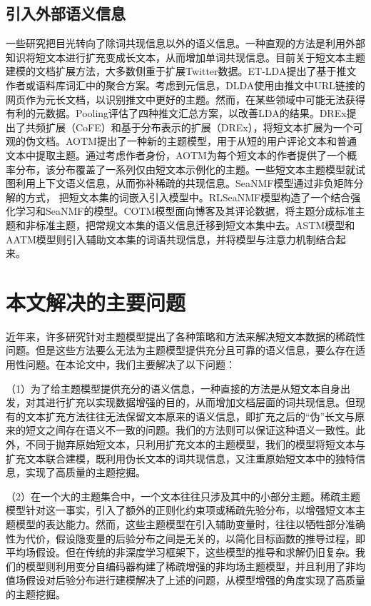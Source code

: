 \subsection{引入外部语义信息}
一些研究把目光转向了除词共现信息以外的语义信息。一种直观的方法是利用外部知识将短文本进行扩充变成长文本，从而增加单词共现信息。目前关于短文本主题建模的文档扩展方法，大多数侧重于扩展Twitter数据。ET-LDA\cite{ExTwitter}提出了基于推文作者或语料库词汇中的聚合方案。考虑到元信息，DLDA\cite{DualLDA}使用由推文中URL链接的网页作为元长文档，以识别推文中更好的主题。然而，在某些领域中可能无法获得有利的元数据。Pooling\cite{PoolTwitter}评估了四种推文汇总方案，以改善LDA的结果。DREx\cite{DREx}提出了共频扩展（CoFE）和基于分布表示的扩展（DREx），将短文本扩展为一个可观的伪文档。AOTM\cite{AOTM}提出了一种新的主题模型，用于从短的用户评论文本和普通文本中提取主题。通过考虑作者身份，AOTM为每个短文本的作者提供了一个概率分布，该分布覆盖了一系列仅由短文本示例化的主题。一些短文本主题模型就试图利用上下文语义信息，从而弥补稀疏的共现信息。SeaNMF\cite{SeaNMF}模型通过非负矩阵分解的方式， 把短文本集的词嵌入引入模型中。RLSeaNMF\cite{RLSeaNMF}模型构造了一个结合强化学习和SeaNMF的模型。COTM\cite{COTM}模型面向博客及其评论数据，将主题分成标准主题和非标准主题，把常规文本集的语义信息迁移到短文本集中去。ASTM\cite{ASTM}模型和AATM\cite{AATM}模型则引入辅助文本集的词语共现信息，并将模型与注意力机制结合起来。

\section{本文解决的主要问题}
近年来，许多研究针对主题模型提出了各种策略和方法来解决短文本数据的稀疏性问题。但是这些方法要么无法为主题模型提供充分且可靠的语义信息，要么存在适用性问题。在本论文中，我们主要解决了以下问题：

（1）为了给主题模型提供充分的语义信息，一种直接的方法是从短文本自身出发，对其进行扩充以实现数据增强的目的，从而增加文档层面的词共现信息。但现有的文本扩充方法往往无法保留文本原来的语义信息，即扩充之后的“伪”长文与原来的短文之间存在语义不一致的问题。我们的方法则可以保证这种语义一致性。此外，不同于抛弃原始短文本，只利用扩充文本的主题模型，我们的模型将短文本与扩充文本联合建模，既利用伪长文本的词共现信息，又注重原始短文本中的独特信息，实现了高质量的主题挖掘。

（2）在一个大的主题集合中，一个文本往往只涉及其中的小部分主题。稀疏主题模型针对这一事实，引入了额外的正则化约束项或稀疏先验分布，以增强短文本主题模型的表达能力。然而，这些主题模型在引入辅助变量时，往往以牺牲部分准确性为代价，假设隐变量的后验分布之间是无关的，以简化目标函数的推导过程，即平均场假设\cite{VI}。但在传统的非深度学习框架下，这些模型的推导和求解仍旧复杂。我们的模型则利用变分自编码器构建了稀疏增强的非均场主题模型，并且利用了非均值场假设对后验分布进行建模解决了上述的问题，从模型增强的角度实现了高质量的主题挖掘。

